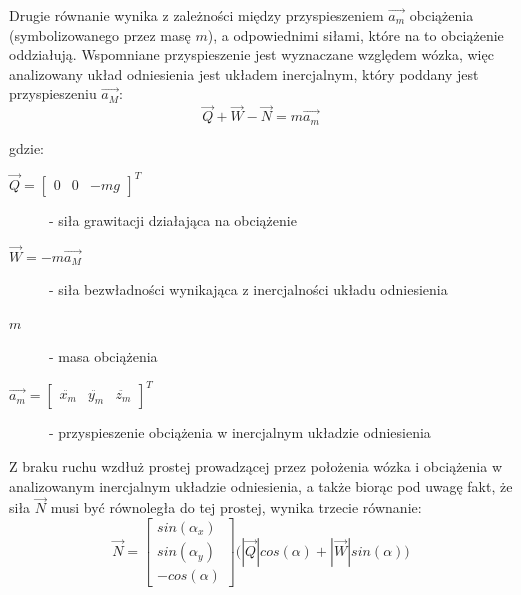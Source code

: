 \documentclass[10pt]{article}
\begin{document}
Drugie równanie wynika z zależności między przyspieszeniem $\vec{a_m}$ obciążenia (symbolizowanego przez masę $m$), a odpowiednimi siłami, które na to obciążenie oddziałują. Wspomniane przyspieszenie jest wyznaczane względem wózka, więc analizowany układ odniesienia jest układem inercjalnym, który poddany jest przyspieszeniu $\vec{a_M}$:
\begin{equation}
\vec{Q} + \vec{W} - \vec{N} = m\vec{a_m}
\end{equation}

gdzie:
\begin{description}
\item[$\vec{Q} = \begin{bmatrix} 0 & 0 & -mg \end{bmatrix}^T$] - siła grawitacji działająca na obciążenie
\item[$\vec{W} = -m\vec{a_M}$] - siła bezwładności wynikająca z inercjalności układu odniesienia
\item[$m$] - masa obciążenia
\item[$\vec{a_m} = \begin{bmatrix} \ddot{x_m} & \ddot{y_m} & \ddot{z_m} \end{bmatrix}^T$] - przyspieszenie obciążenia w inercjalnym układzie odniesienia
\end{description}

Z braku ruchu wzdłuż prostej prowadzącej przez położenia wózka i obciążenia w analizowanym inercjalnym układzie odniesienia, a także biorąc pod uwagę fakt, że siła $\vec{N}$ musi być równoległa do tej prostej, wynika trzecie równanie:
\begin{equation}
\vec{N} = \begin{bmatrix} sin(\alpha_x) \\ sin(\alpha_y) \\ -cos(\alpha) \end{bmatrix}
\big( |\vec{Q}|cos(\alpha) + |\vec{W}|sin(\alpha) \big)
\end{equation}
\end{document}
